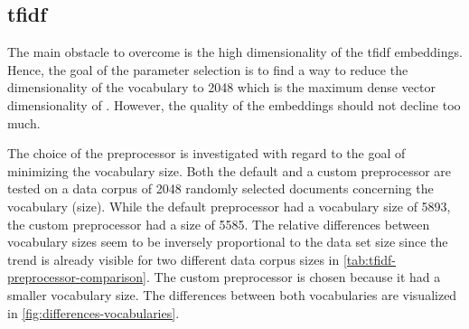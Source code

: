 \subsection*{\acs{tfidf}}\label{subsec:evaluation-tfidf}

The main obstacle to overcome is the high dimensionality of the \ac{tfidf} embeddings.
Hence, the goal of the parameter selection is to find a way to reduce the dimensionality of the vocabulary to 2048 
which is the maximum dense vector dimensionality of \databaseName{}.
However, the quality of the embeddings should not decline too much.

The choice of the preprocessor is investigated with regard to the goal of minimizing the vocabulary size.
Both the default and a custom preprocessor are tested on a data corpus of 2048 randomly selected documents concerning the vocabulary (size).
While the default preprocessor had a vocabulary size of 5893, the custom preprocessor had a size of 5585.
The relative differences between vocabulary sizes seem to be inversely proportional to the data set size 
since the trend is already visible for two different data corpus sizes in \autoref{tab:tfidf-preprocessor-comparison}.
The custom preprocessor is chosen because it had a smaller vocabulary size.
The differences between both vocabularies are visualized in \autoref{fig:differences-vocabularies}.

